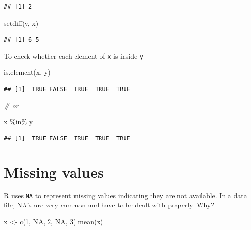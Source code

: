 \documentclass[
]{book}
\newenvironment{Shaded}{\begin{snugshade}}{\end{snugshade}}
\newcommand{\CommentTok}[1]{\textcolor[rgb]{0.56,0.35,0.01}{\textit{#1}}}
\newcommand{\ConstantTok}[1]{\textcolor[rgb]{0.00,0.00,0.00}{#1}}
\newcommand{\DecValTok}[1]{\textcolor[rgb]{0.00,0.00,0.81}{#1}}
\newcommand{\FunctionTok}[1]{\textcolor[rgb]{0.00,0.00,0.00}{#1}}
\newcommand{\NormalTok}[1]{#1}
\newcommand{\OtherTok}[1]{\textcolor[rgb]{0.56,0.35,0.01}{#1}}
\newcommand{\SpecialCharTok}[1]{\textcolor[rgb]{0.00,0.00,0.00}{#1}}
\begin{document}
\begin{verbatim}
## [1] 2
\end{verbatim}

\begin{Shaded}
\begin{Highlighting}[]
\FunctionTok{setdiff}\NormalTok{(y, x)}
\end{Highlighting}
\end{Shaded}

\begin{verbatim}
## [1] 6 5
\end{verbatim}

To check whether each element of \texttt{x} is inside \texttt{y}

\begin{Shaded}
\begin{Highlighting}[]
\FunctionTok{is.element}\NormalTok{(x, y)}
\end{Highlighting}
\end{Shaded}

\begin{verbatim}
## [1]  TRUE FALSE  TRUE  TRUE  TRUE
\end{verbatim}

\begin{Shaded}
\begin{Highlighting}[]
\CommentTok{\# or}

\NormalTok{x }\SpecialCharTok{\%in\%}\NormalTok{ y}
\end{Highlighting}
\end{Shaded}

\begin{verbatim}
## [1]  TRUE FALSE  TRUE  TRUE  TRUE
\end{verbatim}

\hypertarget{missing-values}{%
\section{Missing values}\label{missing-values}}

R uses \texttt{NA} to represent missing values indicating they are not available. In a data file, NA's are very common and have to be dealt with properly. Why?

\begin{Shaded}
\begin{Highlighting}[]
\NormalTok{x }\OtherTok{\textless{}{-}} \FunctionTok{c}\NormalTok{(}\DecValTok{1}\NormalTok{, }\ConstantTok{NA}\NormalTok{, }\DecValTok{2}\NormalTok{, }\ConstantTok{NA}\NormalTok{, }\DecValTok{3}\NormalTok{)}
\FunctionTok{mean}\NormalTok{(x)}
\end{Highlighting}
\end{Shaded}
\end{document}
